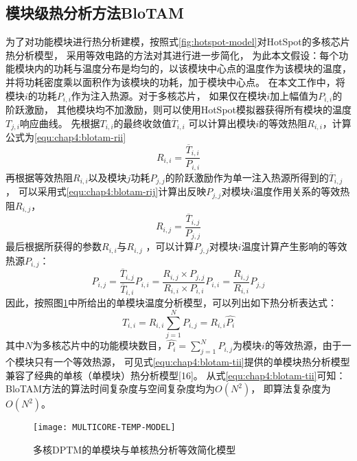 \subsection{模块级热分析方法BloTAM}
为了对功能模块进行热分析建模，按照式\ref{fig:hotspot-model}对HotSpot的多核芯片热分析模型， 采用等效电路的方法对其进行进一步简化， 为此本文假设：每个功能模块内的功耗与温度分布是均匀的，以该模块中心点的温度作为该模块的温度， 并将功耗密度乘以面积作为该模块的功耗，加于模块中心点。
在本文工作中，将模块$i$的功耗$P_{i,i}$作为注入热源。对于多核芯片， 如果仅在模块$i$加上幅值为$P_{i,i}$的阶跃激励， 其他模块均不加激励，则可以使用HotSpot模拟器获得所有模块的温度$T_{j,i}$响应曲线。 先根据$T_{i,i}$的最终收敛值$\overline{T}_{i,i}$ 可以计算出模块$i$的等效热阻$R_{i,i}$，计算公式为\ref{equ:chap4:blotam-rii}
\begin{equation}
\label{equ:chap4:blotam-rii}
R_{i,i} = \frac{\overline{T}_{i,i}}{P_{i,i}}
\end{equation}
再根据等效热阻$R_{i,i}$以及模块$j$功耗$P_{j,j}$的阶跃激励作为单一注入热源所得到的$\overline{T}_{i,j}$， 可以采用式\ref{equ:chap4:blotam-rij}计算出反映$P_{j,j}$对模块$i$温度作用关系的等效热阻$R_{i,j}$，
\begin{equation}
\label{equ:chap4:blotam-rij}
R_{i,j} = \frac{\overline{T}_{i,j}}{P_{j,j}}
\end{equation}
最后根据所获得的参数$R_{i,i}$与$R_{i,j}$ ，可以计算$P_{j,j}$对模块$i$温度计算产生影响的等效热源$P_{i,j}$：
\begin{equation}
\label{equ:chap4:blotam-pij}
P_{i,j} = \frac{\overline{T}_{i,j}}{\overline{T}_{i,i}}P_{i,i} = \frac{R_{i,j}\times P_{j,j}}{R_{i,i}\times P_{i,i}}P_{i,i}=\frac{R_{i,j}}{R_{i,i}}P_{j,j}
\end{equation}
因此，按照图\ref{fig:multicore-temp-model}中所给出的单模块温度分析模型，可以列出如下热分析表达式：
\begin{equation}
\label{equ:chap4:blotam-tii}
T_{i,i} = R_{i,i}\sum\limits_{j=1}^N P_{i,j} = R_{i,i}\widehat{P_{i}}
\end{equation}
其中$N$为多核芯片中的功能模块数目，$\widehat{P_{i}} = \sum\limits_{j=1}^N P_{i,j}$为模块$i$的等效热源，由于一个模块只有一个等效热源， 可见式\ref{equ:chap4:blotam-tii}提供的单模块热分析模型兼容了经典的单核（单模块）热分析模型[16]。 从式\ref{equ:chap4:blotam-tii}可知：BloTAM方法的算法时间复杂度与空间复杂度均为$O(N^2)$， 即算法复杂度为$O(N^2)$。
\begin{figure}[H]
  \centering
  \texttt{[image: MULTICORE-TEMP-MODEL]}
  \caption{多核DPTM的单模块与单核热分析等效简化模型}
  \label{fig:multicore-temp-model}
\end{figure}

